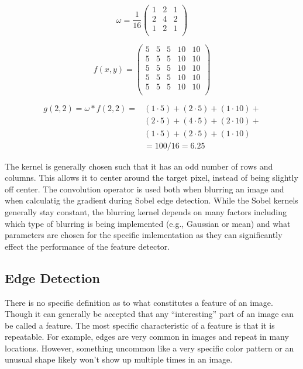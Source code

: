 \documentclass[12pt]{article}
\begin{document}
			\begin{equation}
				\omega = 
				\frac{1}{16}
				\begin{pmatrix}
					\label{eq:exampleKernel}
					1 	& 2 	& 1 \\
					2 	& 4 	& 2 \\
					1 	& 2 	& 1 \\
				\end{pmatrix}
			\end{equation}

			\begin{equation}
				f(x,y) =
				\begin{pmatrix}
					\label{eq:exampleImage}
					5 	& 5 	& 5 	& 10 	& 10 \\
					5 	& 5 	& 5 	& 10 	& 10 \\
					5 	& 5 	& 5 	& 10 	& 10 \\
					5 	& 5 	& 5 	& 10 	& 10 \\
					5 	& 5 	& 5 	& 10 	& 10 \\
				\end{pmatrix}
			\end{equation}

			\begin{align}
				g( 2, 2 ) = \omega * f( 2, 2 ) = 	&( 1 \cdot 5 ) + ( 2 \cdot 5 ) + ( 1 \cdot 10 ) + \nonumber\\	
													&( 2 \cdot 5 ) + ( 4 \cdot 5 ) + ( 2 \cdot 10 ) + \\
													&( 1 \cdot 5 ) + ( 2 \cdot 5 ) + ( 1 \cdot 10 )   \nonumber\\
													& = 100 / 16 = 6.25 \nonumber
				\label{eq:exampleKernelCalc}
			\end{align}

			The kernel is generally chosen such that it has an odd number of rows and columns. This allows it to center around the target pixel, instead of being slightly off center. The convolution operator is used both when blurring an image and when calculatig the gradient during Sobel edge detection. While the Sobel kernels generally stay constant, the blurring kernel depends on many factors including which type of blurring is being implemented (e.g., Gaussian or mean) and what parameters are chosen for the specific imlementation as they can significantly effect the performance of the feature detector.

		\subsection{Edge Detection}
			There is no specific definition as to what constitutes a feature of an image. Though it can generally be accepted that any ``interesting'' part of an image can be called a feature. The most specific characteristic of a feature is that it is repeatable. For example, edges are very common in images and repeat in many locations. However, something uncommon like a very specific color pattern or an unusual shape likely won't show up multiple times in an image. 
\end{document}
